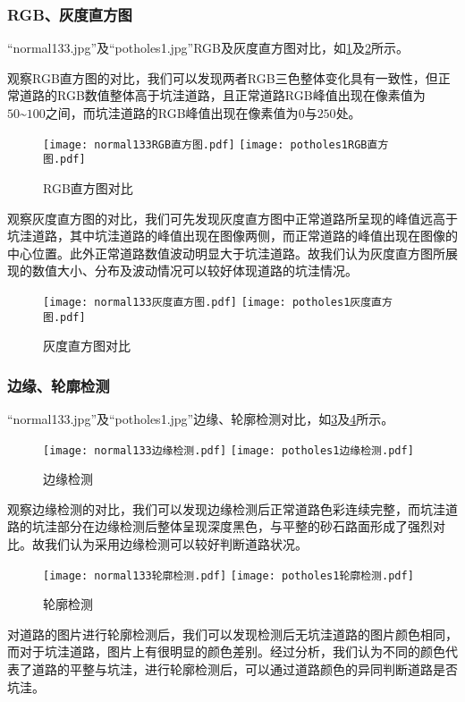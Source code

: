 \documentclass{MathorCupmodeling}
\begin{document}
	\subsubsection{RGB、灰度直方图}
	“normal133.jpg”及“potholes1.jpg”RGB及灰度直方图对比，如\textcolor{blue}{\cref{fig:RGB对比}}及\textcolor{blue}{\cref{fig:灰度对比}}所示。
	
	观察RGB直方图的对比，我们可以发现两者RGB三色整体变化具有一致性，但正常道路的RGB数值整体高于坑洼道路，且正常道路RGB峰值出现在像素值为$50\text{\textasciitilde}100$之间，而坑洼道路的RGB峰值出现在像素值为$0$与$250$处。
	\begin{figure}[H]
		\centering
		\texttt{[image: normal133RGB直方图.pdf]}
		\hspace{0.3in}
		\texttt{[image: potholes1RGB直方图.pdf]}
		\caption{RGB直方图对比}
		\label{fig:RGB对比}
	\end{figure}

	观察灰度直方图的对比，我们可先发现灰度直方图中正常道路所呈现的峰值远高于坑洼道路，其中坑洼道路的峰值出现在图像两侧，而正常道路的峰值出现在图像的中心位置。此外正常道路数值波动明显大于坑洼道路。故我们认为灰度直方图所展现的数值大小、分布及波动情况可以较好体现道路的坑洼情况。
	\begin{figure}[H]
		\centering
		\texttt{[image: normal133灰度直方图.pdf]}
		\hspace{0.3in}
		\texttt{[image: potholes1灰度直方图.pdf]}
		\caption{灰度直方图对比}
		\label{fig:灰度对比}
	\end{figure}
	
	\subsubsection{边缘、轮廓检测}
	“normal133.jpg”及“potholes1.jpg”边缘、轮廓检测对比，如\textcolor{blue}{\cref{fig:边缘检测}}及\textcolor{blue}{\cref{fig:轮廓检测}}所示。
	\begin{figure}[H]
		\centering
		\texttt{[image: normal133边缘检测.pdf]}
		\hspace{0.3in}
		\texttt{[image: potholes1边缘检测.pdf]}
		\caption{边缘检测}
		\label{fig:边缘检测}
	\end{figure}
	观察边缘检测的对比，我们可以发现边缘检测后正常道路色彩连续完整，而坑洼道路的坑洼部分在边缘检测后整体呈现深度黑色，与平整的砂石路面形成了强烈对比。故我们认为采用边缘检测可以较好判断道路状况。

	\begin{figure}[H]
		\centering
		\texttt{[image: normal133轮廓检测.pdf]}
		\hspace{0.3in}
		\texttt{[image: potholes1轮廓检测.pdf]}
		\caption{轮廓检测}
		\label{fig:轮廓检测}
	\end{figure}
	对道路的图片进行轮廓检测后，我们可以发现检测后无坑洼道路的图片颜色相同，而对于坑洼道路，图片上有很明显的颜色差别。经过分析，我们认为不同的颜色代表了道路的平整与坑洼，进行轮廓检测后，可以通过道路颜色的异同判断道路是否坑洼。
\end{document}
